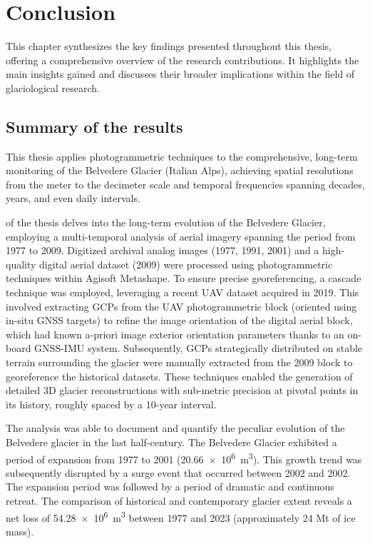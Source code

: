 \chapter{Conclusion}
\label{conclusion}

This chapter synthesizes the key findings presented throughout this thesis, offering a comprehensive overview of the research contributions. 
It highlights the main insights gained and discusses their broader implications within the field of glaciological research.

\section{Summary of the results}

This thesis applies photogrammetric techniques to the comprehensive, long-term monitoring of the Belvedere Glacier (Italian Alps), achieving spatial resolutions from the meter to the decimeter scale and temporal frequencies spanning decades, years, and even daily intervals.

 of the thesis delves into the long-term evolution of the Belvedere Glacier, employing a multi-temporal analysis of aerial imagery spanning the period from 1977 to 2009. 
Digitized archival analog images (1977, 1991, 2001) and a high-quality digital aerial dataset (2009) were processed using photogrammetric techniques within Agisoft Metashape.
To ensure precise georeferencing, a cascade technique was employed, leveraging a recent UAV dataset acquired in 2019.
This involved extracting GCPs from the UAV photogrammetric block (oriented using in-situ GNSS targets) to refine the image orientation of the digital aerial block, which had known a-priori image exterior orientation parameters thanks to an on-board GNSS-IMU system. 
Subsequently, GCPs strategically distributed on stable terrain surrounding the glacier were manually extracted from the 2009 block to georeference the historical datasets.
These techniques enabled the generation of detailed 3D glacier reconstructions with sub-metric precision at pivotal points in its history, roughly spaced by a 10-year interval.

The analysis was able to document and quantify the peculiar evolution of the Belvedere glacier in the last half-century.
The Belvedere Glacier exhibited a period of expansion from 1977 to 2001 (\SI{+20.66e6}{\cubic\meter}). 
This growth trend was subsequently disrupted by a surge event that occurred between 2002 and 2002.
The expansion period was followed by a period of dramatic and continuous retreat.  
The comparison of historical and contemporary glacier extent reveals a net loss of \SI{54.28e6}{\cubic\meter} between 1977 and 2023 (approximately 24 Mt of ice mass).

